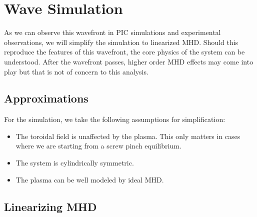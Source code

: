 \section{Wave Simulation}

As we can observe this wavefront in PIC simulations and experimental observations, we will simplify the simulation to linearized MHD. Should this reproduce the features of this wavefront, the core physics of the system can be understood. After the wavefront passes, higher order MHD effects may come into play but that is not of concern to this analysis.

\subsection{Approximations}

For the simulation, we take the following assumptions for simplification:
\begin{itemize}
    \item The toroidal field is unaffected by the plasma. This only matters in cases where we are starting from a screw pinch equilibrium.
    \item The system is cylindrically symmetric.
    \item The plasma can be well modeled by ideal MHD.
\end{itemize}

\subsection{Linearizing MHD}

